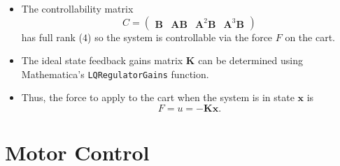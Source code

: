 \documentclass{article}
\renewcommand{\vec}[1]{\boldsymbol{\mathbf{#1}}}
\begin{document}
\begin{itemize}
  \item The controllability matrix \[C = \begin{pmatrix}
            \vec{B} & \vec{A} \vec{B} & \vec{A}^2 \vec{B} & \vec{A}^3 \vec{B}
          \end{pmatrix}\] has full rank ($4$) so the system is controllable via the force $F$ on the cart.

  \item The ideal state feedback gains matrix $\vec{K}$ can be determined using Mathematica's \texttt{LQRegulatorGains} function.

  \item Thus, the force to apply to the cart when the system is in state $\vec{x}$ is \[F = u = -\vec{K} \vec{x}.\]
\end{itemize}

\section{Motor Control}
\end{document}
